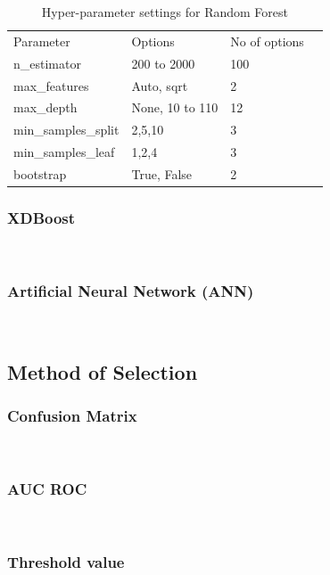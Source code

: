 \begin{table}[h]
    \begin{tabular}{llll}
    Parameter           & Options         & No of options \\
    n\_estimator        & 200 to 2000     & 100           \\
    max\_features       & Auto, sqrt      & 2             \\
    max\_depth          & None, 10 to 110 & 12            \\
    min\_samples\_split & 2,5,10          & 3              \\
    min\_samples\_leaf  & 1,2,4           & 3              \\
    bootstrap           & True, False     & 2              \\
    \end{tabular}
    \caption{Hyper-parameter settings for Random Forest}
    \label{tab:RF_param}
\end{table}


\subsubsection{XDBoost}\hspace*{\fill} \\
\subsubsection{Artificial Neural Network (ANN)}\hspace*{\fill} \\





\subsection{Method of Selection}
\subsubsection{Confusion Matrix}\hspace*{\fill} \\
\subsubsection{AUC ROC}\hspace*{\fill} \\
\subsubsection{Threshold value}\hspace*{\fill} \\
